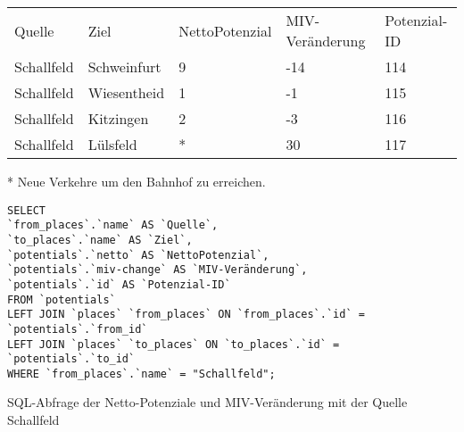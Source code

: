 \begin{tabularx}{\textwidth}{*5{X}}
Quelle & Ziel & NettoPotenzial & MIV-Veränderung & Potenzial-ID\\ 
Schallfeld & Schweinfurt & 9 & -14 & 114\\ 
Schallfeld & Wiesentheid & 1 & -1 & 115\\ 
Schallfeld & Kitzingen & 2 & -3 & 116\\ 
Schallfeld & Lülsfeld & * & 30 & 117\\ 
\end{tabularx}    
\newline
\newline
* Neue Verkehre um den Bahnhof zu erreichen.
\newline
\begin{listing}[htbp]
\begin{verbatim}
SELECT
`from_places`.`name` AS `Quelle`, 
`to_places`.`name` AS `Ziel`, 
`potentials`.`netto` AS `NettoPotenzial`, 
`potentials`.`miv-change` AS `MIV-Veränderung`, 
`potentials`.`id` AS `Potenzial-ID`
FROM `potentials`
LEFT JOIN `places` `from_places` ON `from_places`.`id` = `potentials`.`from_id`
LEFT JOIN `places` `to_places` ON `to_places`.`id` = `potentials`.`to_id`
WHERE `from_places`.`name` = "Schallfeld";
\end{verbatim}
\caption{SQL-Abfrage der Netto-Potenziale und MIV-Veränderung mit der Quelle Schallfeld}\label{lst-fz-schallfeld}
\end{listing}